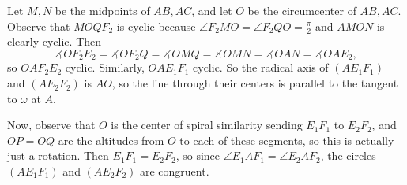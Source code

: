 Let $M,N$ be the midpoints of $AB,AC$, and let $O$ be the circumcenter of $AB,AC$. Observe that $MOQF_2$ is cyclic because $\angle{F_2MO}=\angle{F_2QO}=\frac{\pi}{2}$ and $AMON$ is clearly cyclic. Then \[\measuredangle{OF_2E_2}=\measuredangle{OF_2Q}=\measuredangle{OMQ}=\measuredangle{OMN}=\measuredangle{OAN}=\measuredangle{OAE_2},\] so $OAF_2E_2$ cyclic. Similarly, $OAE_1F_1$ cyclic. So the radical axis of $\left(AE_1F_1\right)$ and $\left(AE_2F_2\right)$ is $AO$, so the line through their centers is parallel to the tangent to $\omega$ at $A$.

Now, observe that $O$ is the center of spiral similarity sending $E_1F_1$ to $E_2F_2$, and $OP=OQ$ are the altitudes from $O$ to each of these segments, so this is actually just a rotation. Then $E_1F_1=E_2F_2$, so since $\angle{E_1AF_1}=\angle{E_2AF_2}$, the circles $\left(AE_1F_1\right)$ and $\left(AE_2F_2\right)$ are congruent.